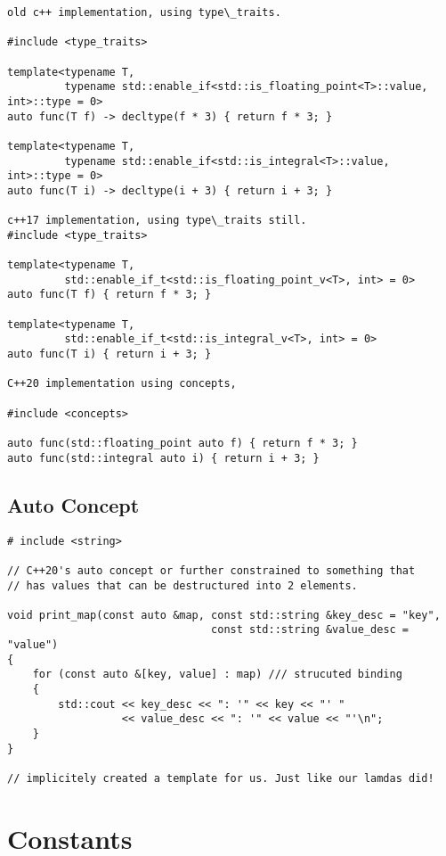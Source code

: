 \begin{verbatim}
old c++ implementation, using type\_traits.

#include <type_traits>

template<typename T,
         typename std::enable_if<std::is_floating_point<T>::value, int>::type = 0>
auto func(T f) -> decltype(f * 3) { return f * 3; }

template<typename T,
         typename std::enable_if<std::is_integral<T>::value, int>::type = 0>
auto func(T i) -> decltype(i + 3) { return i + 3; }

c++17 implementation, using type\_traits still.
#include <type_traits>

template<typename T,
         std::enable_if_t<std::is_floating_point_v<T>, int> = 0>
auto func(T f) { return f * 3; }

template<typename T,
         std::enable_if_t<std::is_integral_v<T>, int> = 0>
auto func(T i) { return i + 3; }

C++20 implementation using concepts, 

#include <concepts>

auto func(std::floating_point auto f) { return f * 3; }
auto func(std::integral auto i) { return i + 3; }
\end{verbatim}

\subsection{Auto Concept}

\begin{verbatim}
# include <string>

// C++20's auto concept or further constrained to something that
// has values that can be destructured into 2 elements.

void print_map(const auto &map, const std::string &key_desc = "key",
                                const std::string &value_desc = "value")
{
    for (const auto &[key, value] : map) /// strucuted binding
    {
        std::cout << key_desc << ": '" << key << "' "
                  << value_desc << ": '" << value << "'\n";
    }
}

// implicitely created a template for us. Just like our lamdas did!
\end{verbatim}

\section{Constants}

